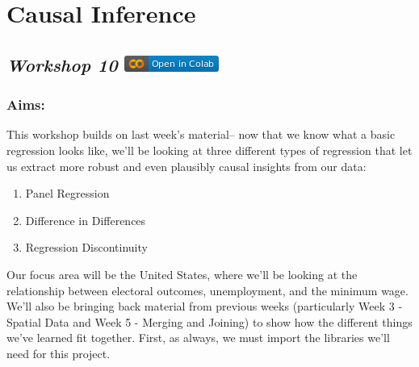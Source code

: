 \documentclass[
  letterpaper,
  DIV=11,
  numbers=noendperiod]{scrreprt}
\providecommand{\tightlist}{%
  \setlength{\itemsep}{0pt}\setlength{\parskip}{0pt}}\usepackage{longtable,booktabs,array}
\begin{document}

\hypertarget{causal-inference}{%
\chapter{Causal Inference}\label{causal-inference}}

\hypertarget{workshop-10-open-in-colab}{%
\section[\emph{Workshop 10} ]{\texorpdfstring{\emph{Workshop 10}
\href{https://colab.research.google.com/github/oballinger/QM2/blob/main/notebooks/W10.\%20Causal\%20Inference.ipynb}{\protect\includegraphics{index_files/mediabag/colab-badge.png}}}{Workshop 10 Open In Colab}}\label{workshop-10-open-in-colab}}

\hypertarget{aims-6}{%
\subsection{Aims:}\label{aims-6}}

This workshop builds on last week's material-- now that we know what a
basic regression looks like, we'll be looking at three different types
of regression that let us extract more robust and even plausibly causal
insights from our data:

\begin{enumerate}
\def\labelenumi{\arabic{enumi}.}
\tightlist
\item
  Panel Regression
\item
  Difference in Differences
\item
  Regression Discontinuity
\end{enumerate}

Our focus area will be the United States, where we'll be looking at the
relationship between electoral outcomes, unemployment, and the minimum
wage. We'll also be bringing back material from previous weeks
(particularly Week 3 - Spatial Data and Week 5 - Merging and Joining) to
show how the different things we've learned fit together. First, as
always, we must import the libraries we'll need for this project.
\end{document}
